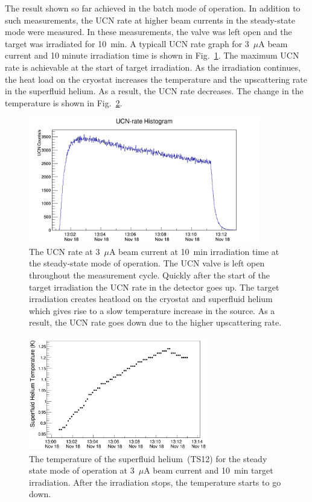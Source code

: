 The result shown so far achieved in the batch mode of operation. In
addition to such measurements, the UCN rate at higher beam currents in
the steady-state mode were measured. In these measurements, the valve
was left open and the target was irradiated for 10~min. A typicall UCN
rate graph for 3~$\mu$A beam current and 10 minute irradiation time is
shown in Fig.~\ref{fig:UCNRate_steadystate}. The maximum UCN rate is
achievable at the start of target irradiation. As the irradiation
continues, the heat load on the cryostat increases the temperature and
the upscattering rate in the superfluid helium. As a result, the UCN
rate decreases. The change in the temperature is shown in
Fig.~\ref{fig:UCNRate_temp}.


\begin{figure}[h!]
  \centering
  \includegraphics[width=0.9\textwidth]{654_UCNRate.png}
  \caption{The UCN rate at 3~$\mu$A beam current at 10~min irradiation
    time at the steady-state mode of operation. The UCN valve is left
    open throughout the measurement cycle. Quickly after the start of
    the target irradiation the UCN rate in the detector goes up. The
    target irradiation creates heatload on the cryostat and superfluid
    helium which gives rise to a slow temperature increase in the
    source. As a result, the UCN rate goes down due to the higher
    upscattering rate.  }
  \label{fig:UCNRate_steadystate}
\end{figure}

\begin{figure}[h!]
  \centering
  \includegraphics[width=0.7\textwidth]{UCNRate_temp.png}
  \caption{ The temperature of the superfluid helium~(TS12) for the
    steady state mode of operation at 3~$\mu$A beam current and 10~min
    target irradiation. After the irradiation stops, the temperature
    starts to go down. }
  \label{fig:UCNRate_temp}
\end{figure}

